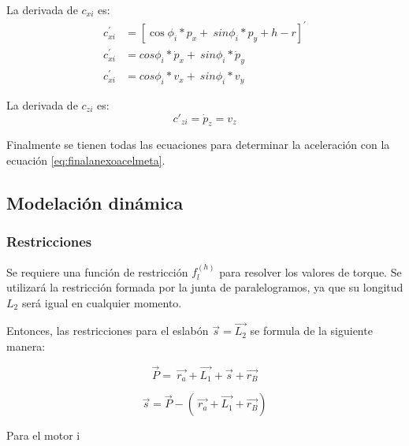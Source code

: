             La derivada de $c_{xi}$ es:
            \begin{align*}
                 c_{xi}^{'}&= \left[ \cos  \phi _{i}\ast p_{x}+~ sin \phi _{i}\ast    p_{y}+h-r \right] ^{'} \\
                 c_{xi}^{'}&=cos \phi _{i}\ast\dot{p}_{x}+~ sin \phi _{i}\ast\dot{p}_{y} \\
                 c_{xi}^{'}&=cos \phi _{i}\ast v_{x}+~ sin \phi _{i}\ast v_{y}
            \end{align*}

            La derivada de $c_{zi}$ es:
            \begin{equation*}
                c'_{zi}=\dot{p}_{z}=v_{z}       
            \end{equation*}

        Finalmente se tienen todas las ecuaciones para determinar la aceleración con la ecuación \ref{eq:finalanexoacelmeta}.
    \newpage

  \subsection{Modelación dinámica}
            \subsubsection{Restricciones}
            
                Se requiere una función de restricción  \( f_{l}^{ \left( h \right) } \)  para resolver los valores de torque. Se utilizará la restricción formada por la junta de paralelogramos, ya que su longitud  \( L_{2} \)  será igual en cualquier momento.
                
                Entonces, las restricciones para el eslabón  \( \overrightarrow{s}=\overrightarrow{L_{2}} \)  se formula de la siguiente manera:
                
                \setlength{\parskip}{0.0pt}
                 \[ \overrightarrow{P}=~ \overrightarrow{r_{a}}+\overrightarrow{L_{1}}+\overrightarrow{s}+\overrightarrow{r_{B}} \] 
                
                 \[ \overrightarrow{s}=\overrightarrow{P}- \left( ~\overrightarrow{r_{a}}+\overrightarrow{L_{1}}+\overrightarrow{r_{B}} \right)  \] 
                
                Para el motor i
                
